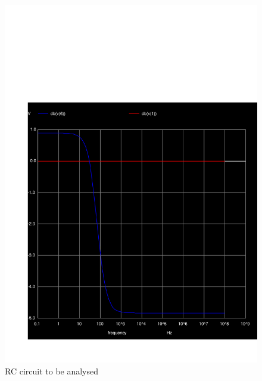   \begin{figure}[H] \centering
    \includegraphics[width=1\linewidth]{../sim/mag5.pdf}
    \caption{RC circuit to be analysed}
    \label{fig:t2}
    \end{figure}

